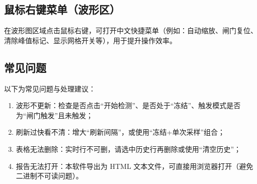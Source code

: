 \subsection{鼠标右键菜单（波形区）}
\par
在波形图区域点击鼠标右键，可打开中文快捷菜单（例如：自动缩放、闸门复位、清除峰值标记、显示网格开关等），用于提升操作效率。

\subsection{常见问题}
\par
以下为常见问题与处理建议：
\begin{enumerate}
	\item 波形不更新：检查是否点击“开始检测”、是否处于“冻结”、触发模式是否为“闸门触发”且未触发；
	\item 刷新过快看不清：增大“刷新间隔”，或使用“冻结+单次采样”组合；
	\item 表格无法删除：实时行不可删，请选中历史行再删除或使用“清空历史”；
	\item 报告无法打开：本软件导出为 HTML 文本文件，可直接用浏览器打开（避免二进制不可读问题）。
\end{enumerate}
